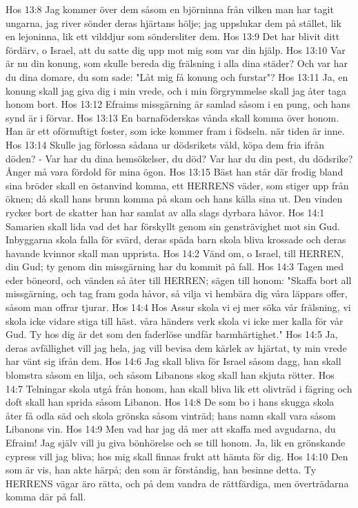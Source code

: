 Hos 13:8  Jag kommer över dem såsom en björninna från vilken man har tagit ungarna, jag river sönder deras hjärtans hölje; jag uppslukar dem på stället, lik en lejoninna, lik ett vilddjur som söndersliter dem.
Hos 13:9  Det har blivit ditt fördärv, o Israel, att du satte dig upp mot mig som var din hjälp.
Hos 13:10  Var är nu din konung, som skulle bereda dig frälsning i alla dina städer? Och var har du dina domare, du som sade: "Låt mig få konung och furstar"?
Hos 13:11  Ja, en konung skall jag giva dig i min vrede, och i min förgrymmelse skall jag åter taga honom bort.
Hos 13:12  Efraims missgärning är samlad såsom i en pung, och hans synd är i förvar.
Hos 13:13  En barnaföderskas vånda skall komma över honom. Han är ett oförnuftigt foster, som icke kommer fram i födseln. när tiden är inne.
Hos 13:14  Skulle jag förlossa sådana ur dödsrikets våld, köpa dem fria ifrån döden? - Var har du dina hemsökelser, du död? Var har du din pest, du dödsrike? Ånger må vara fördold för mina ögon.
Hos 13:15  Bäst han står där frodig bland sina bröder skall en östanvind komma, ett HERRENS väder, som stiger upp från öknen; då skall hans brunn komma på skam och hans källa sina ut. Den vinden rycker bort de skatter han har samlat av alla slags dyrbara håvor.
Hos 14:1  Samarien skall lida vad det har förskyllt genom sin gensträvighet mot sin Gud. Inbyggarna skola falla för svärd, deras späda barn skola bliva krossade och deras havande kvinnor skall man upprista.
Hos 14:2  Vänd om, o Israel, till HERREN, din Gud; ty genom din missgärning har du kommit på fall.
Hos 14:3  Tagen med eder böneord, och vänden så åter till HERREN; sägen till honom: "Skaffa bort all missgärning, och tag fram goda håvor, så vilja vi hembära dig våra läppars offer, såsom man offrar tjurar.
Hos 14:4  Hos Assur skola vi ej mer söka vår frälsning, vi skola icke vidare stiga till häst. våra händers verk skola vi icke mer kalla för vår Gud. Ty hos dig är det som den faderlöse undfår barmhärtighet."
Hos 14:5  Ja, deras avfällighet vill jag hela, jag vill bevisa dem kärlek av hjärtat, ty min vrede har vänt sig ifrån dem.
Hos 14:6  Jag skall bliva för Israel såsom dagg, han skall blomstra såsom en lilja, och såsom Libanons skog skall han skjuta rötter.
Hos 14:7  Telningar skola utgå från honom, han skall bliva lik ett olivträd i fägring och doft skall han sprida såsom Libanon.
Hos 14:8  De som bo i hans skugga skola åter få odla säd och skola grönska såsom vinträd; hans namn skall vara såsom Libanons vin.
Hos 14:9  Men vad har jag då mer att skaffa med avgudarna, du Efraim! Jag själv vill ju giva bönhörelse och se till honom. Ja, lik en grönskande cypress vill jag bliva; hos mig skall finnas frukt att hämta för dig.
Hos 14:10  Den som är vis, han akte härpå; den som är förståndig, han besinne detta. Ty HERRENS vägar äro rätta, och på dem vandra de rättfärdiga, men överträdarna komma där på fall.


